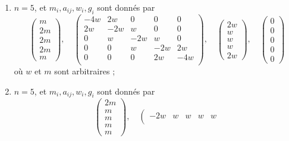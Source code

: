 \begin{lemma}[Genre un]
\begin{enumerate}
$$\begin{matrix}
2w \\
2w \\
w
\end{matrix}
\right),
\quad
\left(
\begin{matrix}
0 \\
0 \\
0 \\
0 \\
0
\end{matrix}
\right)
$$
où $w$ et $m$ sont arbitraires ;
\item
\label{item-down-equal-equal-up}
$n = 5$, et $m_i, a_{ij}, w_i, g_i$ sont donnés par
$$
\left(
\begin{matrix}
m \\
2m \\
2m \\
2m \\
m
\end{matrix}
\right),
\quad
\left(
\begin{matrix}
-4w & 2w & 0 & 0 & 0 \\
2w & -2w & w & 0 & 0 \\
0 & w & -2w & w & 0 \\
0 & 0 & w & -2w & 2w \\
0 & 0 & 0 & 2w & -4w \\
\end{matrix}
\right),
\quad
\left(
\begin{matrix}
2w \\
w \\
w \\
w \\
2w
\end{matrix}
\right),
\quad
\left(
\begin{matrix}
0 \\
0 \\
0 \\
0 \\
0
\end{matrix}
\right)
$$
où $w$ et $m$ sont arbitraires ;
\item
\label{item-quadruple}
$n = 5$, et $m_i, a_{ij}, w_i, g_i$ sont donnés par
$$
\left(
\begin{matrix}
2m \\
m \\
m \\
m \\
m
\end{matrix}
\right),
\quad
\left(
\begin{matrix}
-2w & w & w & w & w \\

\end{matrix}$$
\end{enumerate}
\end{lemma}

